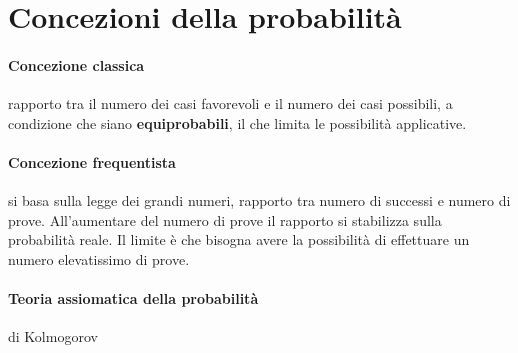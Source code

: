 
\section{Concezioni della probabilità}

\paragraph{Concezione classica}  rapporto tra il numero dei casi favorevoli e il numero dei casi possibili, a condizione che siano \textbf{equiprobabili}, il che limita le possibilità applicative.

\paragraph{Concezione frequentista} si basa sulla legge dei grandi numeri, rapporto tra numero di successi e numero di prove. All'aumentare del numero di prove il rapporto si stabilizza sulla probabilità reale. Il limite è che bisogna avere la possibilità di effettuare un numero elevatissimo di prove.

\paragraph{Teoria assiomatica della probabilità}  di Kolmogorov





